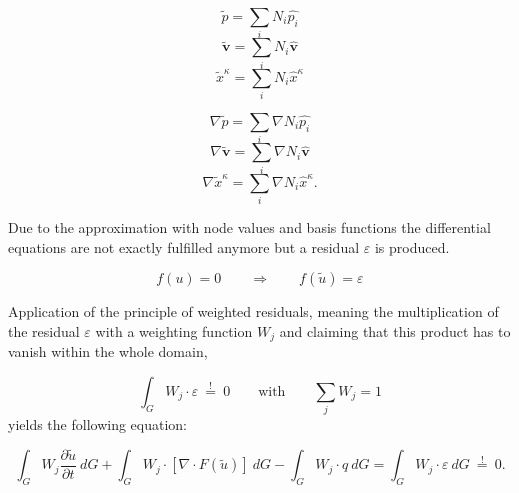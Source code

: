\begin{minipage}[b]{0.47\textwidth}
\begin{equation}
\label{eq:p}
	\tilde p = \sum_i N_i \hat{p_i}
\end{equation}
\begin{equation}
\label{eq:v}
	\tilde{\mathbf v} = \sum_i N_i \hat{\mathbf v}
\end{equation}
\begin{equation}
\label{eq:x}
	\tilde x^\kappa  = \sum_i N_i \hat x^\kappa
\end{equation}
\end{minipage}
\hfill
\begin{minipage}[b]{0.47\textwidth}
\begin{equation}
\label{eq:dp}
	\nabla \tilde p = \sum_i \nabla N_i \hat{p_i}
\end{equation}
\begin{equation}
\label{eq:dv}
	\nabla \tilde{\mathbf v} = \sum_i \nabla N_i \hat{\mathbf v}
\end{equation}
\begin{equation}
\label{eq:dx}
	\nabla \tilde x^\kappa  = \sum_i \nabla N_i \hat x^\kappa .
\end{equation}
\end{minipage}

Due to the approximation with node values and basis functions the differential
equations are not exactly fulfilled anymore but a residual $\varepsilon$ is produced.

\begin{equation}
	f(u) = 0  \qquad \Rightarrow \qquad f(\tilde u) = \varepsilon
\end{equation}

Application of the principle of weighted residuals, meaning the multiplication
of the residual $\varepsilon$ with a weighting function $W_j$  and claiming that
this product has to vanish within the whole domain,

\begin{equation}
	\int_G W_j \cdot \varepsilon \: \overset {!}{=} \: 0 \qquad \textrm{with} \qquad \sum_j W_j =1
\end{equation}
yields the following equation:

\begin{equation}
	\int_G W_j \frac{\partial \tilde u}{\partial t} \: dG + \int_G W_j
	\cdot \left[ \nabla \cdot F(\tilde u) \right]  \: dG - \int_G W_j
	\cdot q \: dG = \int_G W_j \cdot \varepsilon \: dG \: \overset {!}{=} \: 0 .
\end{equation}

